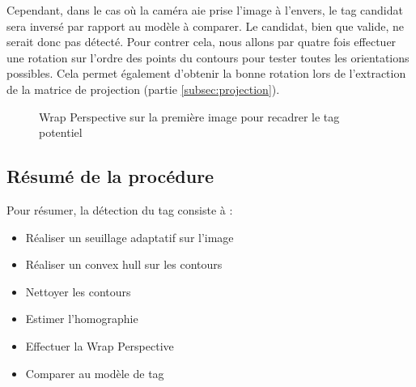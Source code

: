             Cependant, dans le cas où la caméra aie prise l'image à l'envers, le tag candidat sera inversé par rapport au modèle à comparer. Le candidat, bien que valide, ne serait donc pas détecté. Pour contrer cela, nous allons par quatre fois effectuer une rotation sur l'ordre des points du contours pour tester toutes les orientations possibles. Cela permet également d'obtenir la bonne rotation lors de l'extraction de la matrice de projection (partie \ref{subsec:projection}).

        \begin{figure}[h]
            \centering
            \hspace{.02\textwidth}
            \caption{Wrap Perspective sur la première image pour recadrer le tag potentiel}
        \end{figure}
            

        \subsection{Résumé de la procédure}

        Pour résumer, la détection du tag consiste à :

        \begin{itemize}
            \item Réaliser un seuillage adaptatif sur l'image
            \item Réaliser un convex hull sur les contours
            \item Nettoyer les contours
            \item Estimer l'homographie
            \item Effectuer la Wrap Perspective
            \item Comparer au modèle de tag
        \end{itemize}

